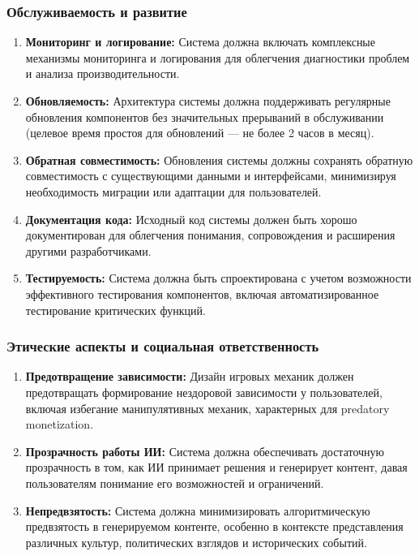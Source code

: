 \subsubsection{Обслуживаемость и развитие}

\begin{enumerate}[label=NFR\arabic*., resume]
    \item \textbf{Мониторинг и логирование:} Система должна включать комплексные механизмы мониторинга и логирования для облегчения диагностики проблем и анализа производительности.

    \item \textbf{Обновляемость:} Архитектура системы должна поддерживать регулярные обновления компонентов без значительных прерываний в обслуживании (целевое время простоя для обновлений — не более 2 часов в месяц).

    \item \textbf{Обратная совместимость:} Обновления системы должны сохранять обратную совместимость с существующими данными и интерфейсами, минимизируя необходимость миграции или адаптации для пользователей.

    \item \textbf{Документация кода:} Исходный код системы должен быть хорошо документирован для облегчения понимания, сопровождения и расширения другими разработчиками.

    \item \textbf{Тестируемость:} Система должна быть спроектирована с учетом возможности эффективного тестирования компонентов, включая автоматизированное тестирование критических функций.
\end{enumerate}

\subsubsection{Этические аспекты и социальная ответственность}

\begin{enumerate}[label=NFR\arabic*., resume]
    \item \textbf{Предотвращение зависимости:} Дизайн игровых механик должен предотвращать формирование нездоровой зависимости у пользователей, включая избегание манипулятивных механик, характерных для predatory monetization.

    \item \textbf{Прозрачность работы ИИ:} Система должна обеспечивать достаточную прозрачность в том, как ИИ принимает решения и генерирует контент, давая пользователям понимание его возможностей и ограничений.

    \item \textbf{Непредвзятость:} Система должна минимизировать алгоритмическую предвзятость в генерируемом контенте, особенно в контексте представления различных культур, политических взглядов и исторических событий.

\end{enumerate}

